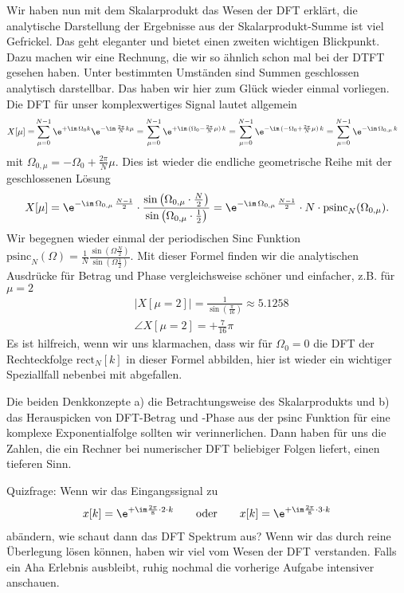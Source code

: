 \begin{ExCalc}
Wir haben nun mit dem Skalarprodukt das Wesen der DFT erklärt,
die analytische Darstellung der Ergebnisse aus der Skalarprodukt-Summe
ist viel Gefrickel.
%
Das geht eleganter und bietet einen zweiten wichtigen Blickpunkt. Dazu
machen wir eine Rechnung, die wir so ähnlich schon mal bei der DTFT gesehen haben.
Unter bestimmten Umständen sind Summen geschlossen analytisch darstellbar.
Das haben wir hier zum Glück wieder einmal vorliegen.
Die DFT für unser komplexwertiges Signal lautet allgemein
\begin{align}
X[\mu] =& \sum_{\mu=0}^{N-1} \e^{+\im\,\Omega_0 k} \e^{-\im\,\frac{2\pi}{N} k \mu}
=  \sum_{\mu=0}^{N-1} \e^{+\im\,(\Omega_0 - \frac{2\pi}{N} \mu) \, k}
=  \sum_{\mu=0}^{N-1} \e^{-\im\,(-\Omega_0 + \frac{2\pi}{N} \mu) \, k}
=  \sum_{\mu=0}^{N-1} \e^{-\im\, \Omega_{0,\mu} \,k}
\end{align}
mit $\Omega_{0,\mu} = -\Omega_0 + \frac{2\pi}{N} \mu$.
Dies ist wieder die endliche geometrische Reihe mit der geschlossenen Lösung
\begin{align}
X[\mu] = \e^{-\im \,\Omega_{0,\mu}\,\frac{N-1}{2}} \cdot
\frac{\sin\left(\Omega_{0,\mu}\cdot\frac{N}{2}\right)}{\sin\left(\Omega_{0,\mu}\cdot\frac{1}{2}\right)}
=\e^{-\im \,\Omega_{0,\mu}\,\frac{N-1}{2}} \cdot N \cdot \mathrm{psinc}_N(\Omega_{0,\mu})
.
\end{align}
Wir begegnen wieder einmal der periodischen Sinc Funktion
$\mathrm{psinc}_N(\Omega) = \frac{1}{N}\frac{\sin({\Omega\frac{N}{2}})}{\sin({\Omega\frac{1}{2}})}$.
%
Mit dieser Formel finden wir die analytischen Ausdrücke für Betrag und Phase
vergleichsweise schöner und einfacher, z.B. für $\mu=2$
\begin{align}
&|X[\mu=2]| = \frac{1}{\sin(\frac{\pi}{16})} \approx 5.1258\\
&\angle X[\mu=2] = +\frac{7}{16}\pi
\end{align}
Es ist hilfreich, wenn wir uns klarmachen, dass wir für $\Omega_0=0$ die DFT der
Rechteckfolge $\mathrm{rect}_N[k]$
in dieser Formel abbilden, hier ist wieder ein wichtiger Speziallfall
nebenbei mit abgefallen.

Die beiden Denkkonzepte
a) die Betrachtungsweise des
Skalarprodukts
und
b) das Herauspicken von DFT-Betrag und -Phase aus der psinc Funktion
für eine komplexe Exponentialfolge
sollten wir verinnerlichen. Dann haben für uns die Zahlen,
die ein Rechner bei numerischer DFT beliebiger Folgen liefert, einen tieferen
Sinn.

Quizfrage: Wenn wir das Eingangssignal zu
\begin{align}
x[k] = \e^{+\im \frac{2\pi}{8} \cdot 2 \cdot k}
\qquad\text{oder}\qquad
x[k] = \e^{+\im \frac{2\pi}{8} \cdot 3 \cdot k}
\end{align}
abändern, wie schaut dann das DFT Spektrum aus? Wenn wir das durch reine
Überlegung lösen können, haben wir viel vom Wesen der DFT
verstanden.
%
Falls ein Aha Erlebnis ausbleibt, ruhig nochmal die vorherige Aufgabe
intensiver anschauen.

\end{ExCalc}


